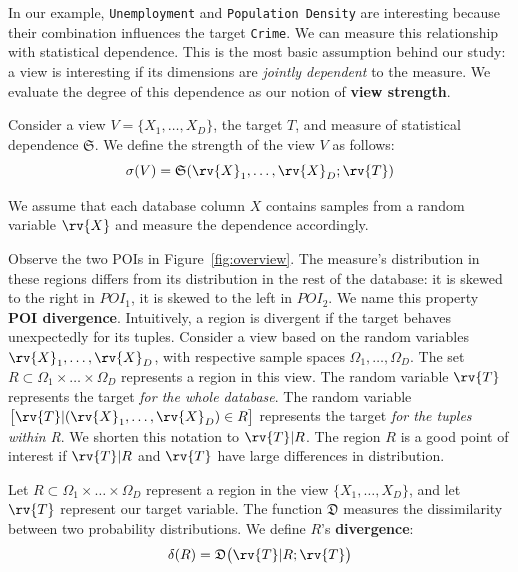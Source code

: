 In our example, \texttt{Unemployment} and \texttt{Population Density} are
interesting because their combination influences the target \texttt{Crime}. We
can measure this relationship with statistical dependence. This is the most
basic assumption behind our study: a view is interesting if its dimensions are
\emph{jointly dependent} to the measure. We evaluate the degree of this
dependence as our notion of \textbf{view strength}. 
\begin{definition}
    Consider a view $V = \{X_1, \ldots, X_D\}$, the target $T$, and measure of
    statistical dependence $\mathfrak{S}$.   We
    define the strength of the view $V$ as follows:
    \begin{equation}\label{eq:strengthgen}
        \sigma(V) = \mathfrak{S}(\rv{X}_1, \ldots, \rv{X}_D ; \rv{T})
    \end{equation}
\end{definition}
We assume that each database column $X$ contains samples from a random variable $\rv{X}$ and measure the dependence accordingly. 

Observe the two POIs in Figure~\ref{fig:overview}.  The measure's distribution
in these regions differs from its distribution in the rest of the database: it
is skewed to the right in $POI_1$, it is skewed to the left in $POI_2$. We name
this property \textbf{POI divergence}. Intuitively, a region is divergent if
the target behaves unexpectedly for its tuples.  Consider a view based on the
random variables $\rv{X}_1, \ldots, \rv{X}_D$, with respective sample spaces
$\Omega_1, \ldots, \Omega_D$.  The set $R\subset \Omega_1 \times \ldots \times
\Omega_D$ represents a region in this view.  The random variable $\rv{T}$
represents the target \emph{for the whole database}.  The random variable
$\big[ \rv{T} | (\rv{X}_1, \ldots, \rv{X}_D) \in R \big] $ represents the
target \emph{for the tuples within R}. We shorten this notation to $\rv{T} |
R$. The region $R$ is a good point of interest if $\rv{T} |R $ and $\rv{T}$
have large differences in distribution.
\begin{definition}
    Let $R\subset \Omega_1 \times \ldots \times \Omega_D$ represent a region in
    the view $\{X_1, \ldots, X_D\}$, and let $\rv{T}$ represent our target
    variable. The function $\mathfrak{D}$ measures the dissimilarity between
    two probability distributions. We define $R$'s \textbf{divergence}:
\begin{equation}\label{eq:divergencegen}
    \delta(R) = \mathfrak{D} \big( \rv{T} | R;  \rv{T}\big)
\end{equation}
\end{definition}


